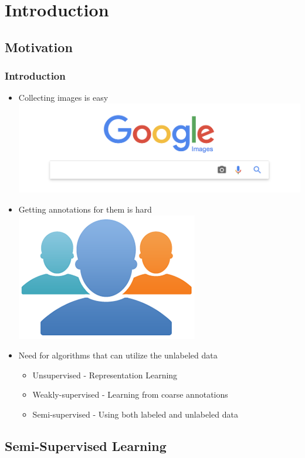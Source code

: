 \section{Introduction}

\subsection{Motivation}
\begin{frame}
	\frametitle{Introduction}
	\begin{itemize}
		\item Collecting images is easy\\
			\includegraphics[scale=0.2, center]{images/google}
		\item Getting annotations for them is hard\\
			\includegraphics[scale=0.2, center]{images/amt}
		\item Need for algorithms that can utilize the unlabeled data
			\begin{itemize}
				\item Unsupervised - Representation Learning
				\item Weakly-supervised - Learning from coarse annotations
				\item Semi-supervised - Using both labeled and unlabeled data
			\end{itemize}
	\end{itemize}
\end{frame}

\subsection{Semi-Supervised Learning}

